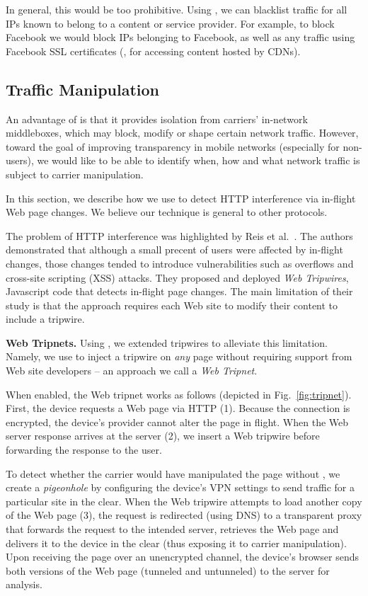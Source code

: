 In general, this would be too prohibitive. Using \meddle, we can blacklist traffic for 
all IPs known to belong to a content or service provider. For example, to block 
Facebook we would block IPs belonging to Facebook, as well as any traffic using Facebook 
SSL certificates (\eg, for accessing content hosted by CDNs). 

\subsection{Traffic Manipulation}
An advantage of \meddle is that it provides isolation from carriers' in-network 
middleboxes, which may block, modify or shape certain network traffic. However, 
toward the goal of improving transparency in mobile networks (especially for 
non-\meddle users), we would like to be able to identify when, how and what 
network traffic is subject to carrier manipulation. 

In this section, we describe how we use \meddle to detect HTTP interference via 
in-flight Web page changes. We believe our technique 
is general to other protocols. 

The problem of HTTP interference was highlighted 
by Reis et al.~\cite{reis:tripwires}. The authors demonstrated that although a small 
precent of users were affected by in-flight changes, those changes tended to introduce 
vulnerabilities such as overflows and cross-site scripting (XSS) attacks. They proposed and deployed 
\emph{Web Tripwires}, Javascript code that detects in-flight page changes. The main 
limitation of their study is that the approach requires each Web site to modify their content to 
include a tripwire.

\noindent\textbf{Web Tripnets.} Using \meddle, we extended tripwires to alleviate this 
limitation. Namely, we use \meddle to inject a tripwire on \emph{any} page without requiring 
support from Web site developers -- an approach we call a \emph{Web Tripnet}.

When enabled, the Web tripnet works as follows (depicted in Fig.~\ref{fig:tripnet}). First, the device requests a Web page via 
HTTP (1). Because the \meddle connection is encrypted, the device's 
provider cannot alter the page in flight. When the Web server response arrives at 
the \meddle server (2), we insert a Web tripwire before forwarding the response to the user. 

To detect whether the carrier would have manipulated the 
page without \meddle, we create a \emph{pigeonhole} by configuring the device's VPN settings to send 
traffic for a particular site in the clear. When the Web tripwire attempts to load another copy 
of the Web page (3), the request is redirected (using DNS) to a transparent proxy that forwards the request to the intended server, 
retrieves the Web page and delivers it to the device in the clear (thus exposing it to carrier manipulation). 
Upon receiving the page over an unencrypted channel, the device's browser sends both 
versions of the Web page (tunneled and untunneled) to the \meddle server for analysis. 

